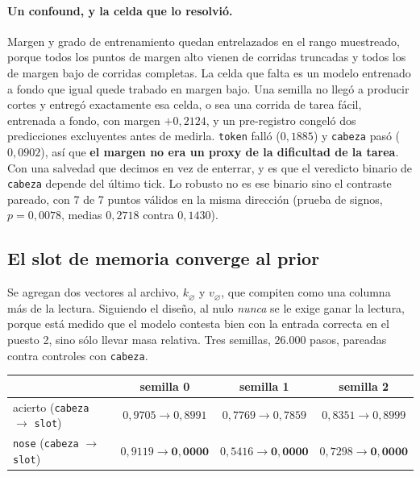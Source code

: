 \documentclass[11pt,a4paper]{article}
\begin{document}
\paragraph{Un confound, y la celda que lo resolvió.} Margen y grado de entrenamiento quedan
entrelazados en el rango muestreado, porque todos los puntos de margen alto vienen de corridas
truncadas y todos los de margen bajo de corridas completas. La celda que falta es un modelo entrenado
a fondo que igual quede trabado en margen bajo. Una semilla no llegó a producir cortes y entregó
exactamente esa celda, o sea una corrida de tarea fácil, entrenada a fondo, con margen $+0{,}2124$, y
un pre-registro congeló dos predicciones excluyentes antes de medirla. \texttt{token} falló
($0{,}1885$) y \texttt{cabeza} pasó ($0{,}0902$), así que \textbf{el margen no era un proxy de la
dificultad de la tarea}. Con una salvedad que decimos en vez de enterrar, y es que el veredicto
binario de \texttt{cabeza} depende del último tick. Lo robusto no es ese binario sino el contraste
pareado, con 7 de 7 puntos válidos en la misma dirección (prueba de signos, $p = 0{,}0078$, medias
$0{,}2718$ contra $0{,}1430$).

\subsection{El slot de memoria converge al prior}
\label{sec:slot}

Se agregan dos vectores al archivo, $k_{\varnothing}$ y $v_{\varnothing}$, que compiten como una
columna más de la lectura. Siguiendo el diseño, al nulo \emph{nunca} se le exige ganar la lectura,
porque está medido que el modelo contesta bien con la entrada correcta en el puesto 2, sino sólo
llevar masa relativa. Tres semillas, $26{.}000$ pasos, pareadas contra controles con \texttt{cabeza}.

\begin{center}
\begin{tabular}{lccc}
\toprule
 & semilla 0 & semilla 1 & semilla 2 \\
\midrule
acierto (\texttt{cabeza} $\rightarrow$ \texttt{slot}) & $0{,}9705 \rightarrow 0{,}8991$ & $0{,}7769 \rightarrow 0{,}7859$ & $0{,}8351 \rightarrow 0{,}8999$ \\
\texttt{nose} (\texttt{cabeza} $\rightarrow$ \texttt{slot}) & $0{,}9119 \rightarrow \mathbf{0{,}0000}$ & $0{,}5416 \rightarrow \mathbf{0{,}0000}$ & $0{,}7298 \rightarrow \mathbf{0{,}0000}$ \\
\bottomrule
\end{tabular}
\end{center}
\end{document}
